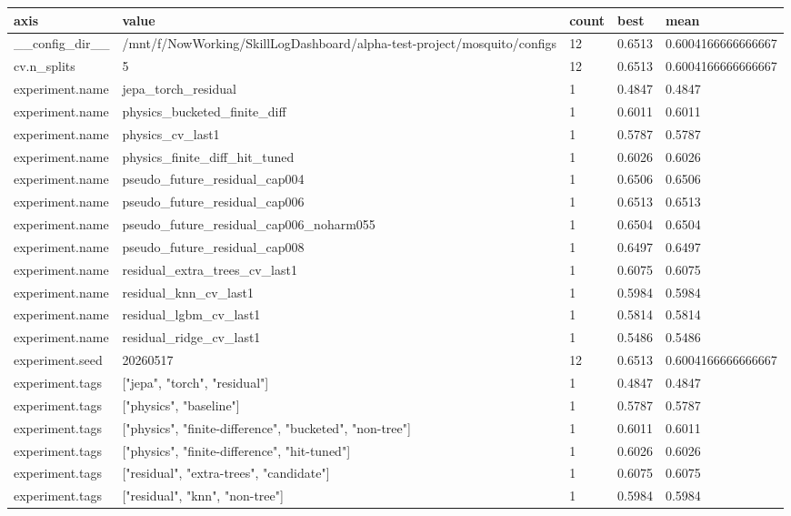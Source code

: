 \begin{tabular}{lllll}
axis & value & count & best & mean \\
\hline
\_\_config\_dir\_\_ & /mnt/f/NowWorking/SkillLogDashboard/alpha-test-project/mosquito/configs & 12 & 0.6513 & 0.6004166666666667 \\
cv.n\_splits & 5 & 12 & 0.6513 & 0.6004166666666667 \\
experiment.name & jepa\_torch\_residual & 1 & 0.4847 & 0.4847 \\
experiment.name & physics\_bucketed\_finite\_diff & 1 & 0.6011 & 0.6011 \\
experiment.name & physics\_cv\_last1 & 1 & 0.5787 & 0.5787 \\
experiment.name & physics\_finite\_diff\_hit\_tuned & 1 & 0.6026 & 0.6026 \\
experiment.name & pseudo\_future\_residual\_cap004 & 1 & 0.6506 & 0.6506 \\
experiment.name & pseudo\_future\_residual\_cap006 & 1 & 0.6513 & 0.6513 \\
experiment.name & pseudo\_future\_residual\_cap006\_noharm055 & 1 & 0.6504 & 0.6504 \\
experiment.name & pseudo\_future\_residual\_cap008 & 1 & 0.6497 & 0.6497 \\
experiment.name & residual\_extra\_trees\_cv\_last1 & 1 & 0.6075 & 0.6075 \\
experiment.name & residual\_knn\_cv\_last1 & 1 & 0.5984 & 0.5984 \\
experiment.name & residual\_lgbm\_cv\_last1 & 1 & 0.5814 & 0.5814 \\
experiment.name & residual\_ridge\_cv\_last1 & 1 & 0.5486 & 0.5486 \\
experiment.seed & 20260517 & 12 & 0.6513 & 0.6004166666666667 \\
experiment.tags & ["jepa", "torch", "residual"] & 1 & 0.4847 & 0.4847 \\
experiment.tags & ["physics", "baseline"] & 1 & 0.5787 & 0.5787 \\
experiment.tags & ["physics", "finite-difference", "bucketed", "non-tree"] & 1 & 0.6011 & 0.6011 \\
experiment.tags & ["physics", "finite-difference", "hit-tuned"] & 1 & 0.6026 & 0.6026 \\
experiment.tags & ["residual", "extra-trees", "candidate"] & 1 & 0.6075 & 0.6075 \\
experiment.tags & ["residual", "knn", "non-tree"] & 1 & 0.5984 & 0.5984 \\

\end{tabular}
